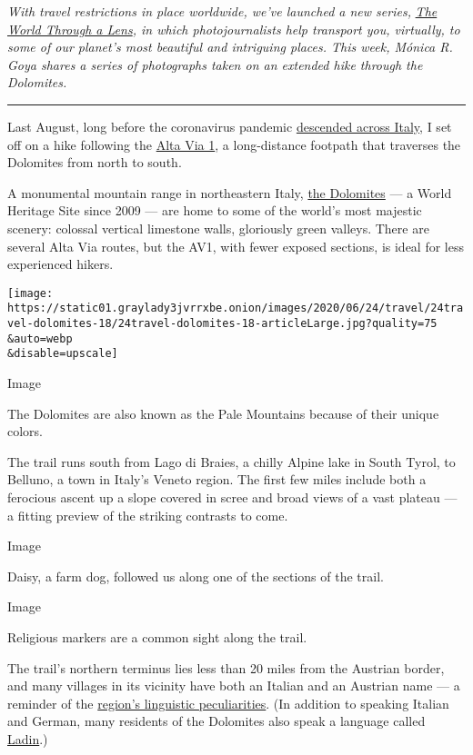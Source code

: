 \emph{With travel restrictions in place worldwide, we've launched a new
series,}
\href{https://www.nytimes3xbfgragh.onion/column/the-world-through-a-lens}{\emph{The
World Through a Lens}}\emph{, in which photojournalists help transport
you, virtually, to some of our planet's most beautiful and intriguing
places. This week, Mónica R. Goya shares a series of photographs taken
on an extended hike through the Dolomites.}

\begin{center}\rule{0.5\linewidth}{\linethickness}\end{center}

Last August, long before the coronavirus pandemic
\href{https://www.nytimes3xbfgragh.onion/2020/03/21/world/europe/italy-coronavirus-center-lessons.html}{descended
across Italy}, I set off on a hike following the
\href{https://www.alpineexploratory.com/walking-guides/alta-via-1.html}{Alta
Via 1}, a long-distance footpath that traverses the Dolomites from north
to south.

A monumental mountain range in northeastern Italy,
\href{https://www.nytimes3xbfgragh.onion/2018/08/30/travel/what-to-do-in-the-dolomites.html}{the
Dolomites} --- a World Heritage Site since 2009 --- are home to some of
the world's most majestic scenery: colossal vertical limestone walls,
gloriously green valleys. There are several Alta Via routes, but the
AV1, with fewer exposed sections, is ideal for less experienced hikers.

\texttt{[image: https://static01.graylady3jvrrxbe.onion/images/2020/06/24/travel/24travel-dolomites-18/24travel-dolomites-18-articleLarge.jpg?quality=75\\\&auto=webp\\\&disable=upscale]}

Image

The Dolomites are also known as the Pale Mountains because of their
unique colors.

The trail runs south from Lago di Braies, a chilly Alpine lake in South
Tyrol, to Belluno, a town in Italy's Veneto region. The first few miles
include both a ferocious ascent up a slope covered in scree and broad
views of a vast plateau --- a fitting preview of the striking contrasts
to come.

Image

Daisy, a farm dog, followed us along one of the sections of the trail.

Image

Religious markers are a common sight along the trail.

The trail's northern terminus lies less than 20 miles from the Austrian
border, and many villages in its vicinity have both an Italian and an
Austrian name --- a reminder of the
\href{https://www.nytimes3xbfgragh.onion/2014/03/25/world/europe/italys-historic-multicultural-compromise.html}{region's
linguistic peculiarities}. (In addition to speaking Italian and German,
many residents of the Dolomites also speak a language called
\href{https://www.altabadia.org/en/italian-alps-dolomites/about-alta-badia/the-ladin-language-and-culture.html}{Ladin}.)

